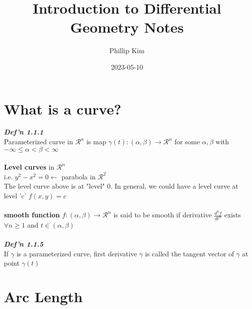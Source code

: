 \documentclass[12pt]{article}
\title{Introduction to Differential Geometry Notes}
\author{Phillip Kim}
\date{2023-05-10}
\begin{document}
\maketitle

\section{What is a curve?}

\emph{\bfseries Def'n 1.1.1} \\
Parameterized curve in \( \mathcal{R}^n \) is map \( \gamma(t):(\alpha, \beta) \longrightarrow \mathcal{R}^n \) for some \( \alpha, \beta \) with \( -\infty \leq \alpha < \beta < \infty \)
\\
\\
{\bfseries Level curves} in \( \mathcal{R}^n \) \\
i.e. \( y^2 - x^2 = 0 \leftarrow \) parabola in \( \mathcal{R}^2 \) \\
The level curve above is at "level" 0. In general, we could have a level curve at level 'c' \( f(x, y) = c\)
\\
\\
{\bfseries smooth function} \( f: (\alpha, \beta) \longrightarrow \mathcal{R}^n \) is said to be smooth if derivative \( \frac{d^n f}{d t^n} \) exists \( \forall n \geq 1 \) and \( t \in (\alpha, \beta) \)
\\
\\
\emph{\bfseries Def'n 1.1.5} \\
If \( \gamma \) is a parameterized curve, first derivative \( \overset{.}{\gamma} \) is called the tangent vector of \( \gamma \) at point \( \gamma(t) \)

\section{Arc Length}
\end{document}
